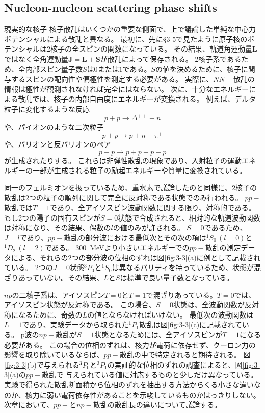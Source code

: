 \documentclass[a4paper,11pt,uplatex]{jsarticle}
\begin{document}
\subsection*{Nucleon-nucleon scattering phase shifts}
現実的な核子-核子散乱はいくつかの重要な側面で、上で議論した単純な中心力ポテンシャルによる散乱と異なる。
最初に、先に\S{3-5}で見たように原子核のポテンシャルは2核子の全スピンの関数になっている。
その結果、軌道角運動量$\bm{L}$ではなく全角運動量$\bm{J}=\bm{L}+\bm{S}$が散乱によって保存される。
2核子系であるため、全内部スピン量子数$S$は$0$または$1$である。$S$の値を決めるために、核子に関与するスピンの配向性や偏極性を測定する必要がある。
実際に、$NN-$散乱の情報は極性が観測されなければ完全にはならない。
次に、十分なエネルギーによる散乱では、核子の内部自由度にエネルギーが変換される。
例えば、デルタ粒子に変化するような反応
\begin{equation}
  p+p\to \Delta^{++}+n
\end{equation}
や、パイオンのような二次粒子
\begin{equation}
  p+p\to p+n+\pi^+
\end{equation}
や、バリオンと反バリオンのペア
\begin{equation}
  p+p\to p+p+p+\bar{p}
\end{equation}
が生成されたりする。
これらは非弾性散乱の現象であり、入射粒子の運動エネルギーの一部が生成される粒子の励起エネルギーや質量に変換されている。

同一のフェルミオンを扱っているため、重水素で議論したのと同様に、2核子の散乱は2つの粒子の順列に関して完全に反対称である状態でのみ行われる。
$pp-$散乱では$T=1$であり、全アイソスピン波動関数に関する限り、対称的である。
もし2つの陽子の固有スピンが$S=0$状態で合成されると、相対的な軌道波動関数は対称になり、その結果、偶数の$l$の値のみが許される。
$S=0$であるため、$J=l$であり、$pp-$散乱の部分波における最低次とその次の項は$^{1}S_0\,(l=0)$と$^{1}D_2\,(l=2)$である。
\SI{300}{MeV}より小さいエネルギーでの$pp-$散乱の測定データによる、それらの2つの部分波の位相のずれは図\ref{fig:3-3}(a)に例として記載されている。
2つの$J=0$状態$^{3}P_0$と$^{1}S_0$は異なるパリティを持っているため、状態が混ざりあっていない。その結果、$L$と$S$は標準で良い量子数となっている。

$np$の二核子系は、アイソスピン$T=0$と$T=1$で混ざりあっている。$T=0$では、アイソスピン状態が反対称である。
この場合、$S=0$状態は、全波動関数が反対称になるために、奇数の$L$の値とならなければいけない。
最低次の波動関数は$L=1$であり、実験データから取られた$^{1}P_1$散乱は図\ref{fig:3-3}(c)に記載されている。
p波の$np-$散乱が$S=1$状態となるためには、全アイソスピンが$T=1$になる必要がある。
この場合の位相のずれは、核力が電荷に依存せず、クーロン力の影響を取り除いているならば、$pp-$散乱の中で特定されると期待される。
図\ref{fig:3-3}(b)で与えられる$^{3}P_0$と$^{3}P_1$の実証的な位相のずれの調査によると、図\ref{fig:3-3}(a)の$pp-$散乱で
与えられている値に対応するものと少しだけ異なっている。
実験で得られた散乱断面積から位相のずれを抽出する方法からくる小さな違いなのか、核力に弱い電荷依存性があることを示唆しているものかはっきりしない。
次章において、$pp-$と$np-$散乱の散乱長の違いについて議論する。
\end{document}
